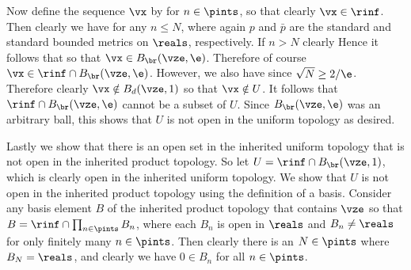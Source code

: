 {{    Now define the sequence $\vx$ by
    for $n \in \pints$, so that clearly $\vx \in \rinf$.
    Then clearly we have
    for any $n \leq N$, where again $p$ and $\bar{p}$ are the standard and standard bounded metrics on $\reals$, respectively.
    If $n > N$ clearly
    Hence it follows that
    so that $\vx \in B_{\br}(\vze, \e)$.
    Therefore of course $\vx \in \rinf \cap B_{\br}(\vze, \e)$.
    However, we also have
    since $\sqrt{N} \geq 2/\e$.
    Therefore clearly $\vx \notin B_d(\vze, 1)$ so that $\vx \notin U$.
    It follows that $\rinf \cap B_{\br}(\vze, \e)$ cannot be a subset of $U$.
    Since $B_{\br}(\vze, \e)$ was an arbitrary ball, this shows that $U$ is not open in the uniform topology as desired.

    Lastly we show that there is an open set in the inherited uniform topology that is not open in the inherited product topology.
    So let $U = \rinf \cap B_{\br}(\vze, 1)$, which is clearly open in the inherited uniform topology.
    We show that $U$ is not open in the inherited product topology using the definition of a basis.
    Consider any basis element $B$ of the inherited product topology that contains $\vze$ so that $B = \rinf \cap \prod_{n \in \pints} B_n$, where each $B_n$ is open in $\reals$ and $B_n \neq \reals$ for only finitely many $n \in \pints$.
    Then clearly there is an $N \in \pints$ where $B_N = \reals$, and clearly we have $0 \in B_n$ for all $n \in \pints$.

}}
